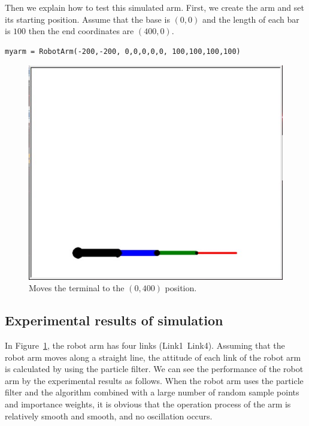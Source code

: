 \documentclass[journal,article,submit,pdftex,moreauthors]{Definitions/mdpi}
\begin{document}
Then we explain how to test this simulated arm. First, we create the arm and set its starting position. Assume that the base is $(0, 0)$ and the length of each bar is $100$ then the end coordinates are $(400, 0)$.

\begin{verbatim}
myarm = RobotArm(-200,-200, 0,0,0,0,0, 100,100,100,100)
\end{verbatim}

\begin{figure}[H]
\includegraphics[width=10.5 cm]{Definitions/fig3}
\caption{Moves the terminal to the $(0,400)$ position. \label{fig3}}
\end{figure}   

\subsection{Experimental results of simulation}
In Figure~\ref{fig3}, the robot arm has four links (Link1~Link4). Assuming that the robot arm moves along a straight line, the attitude of each link of the robot arm is calculated by using the particle filter.
We can see the performance of the robot arm by the experimental results as follows. When the robot arm uses the particle filter and the algorithm combined with a large number of random sample points and importance weights, it is obvious that the operation process of the arm is relatively smooth and smooth, and no oscillation occurs.
\end{document}

